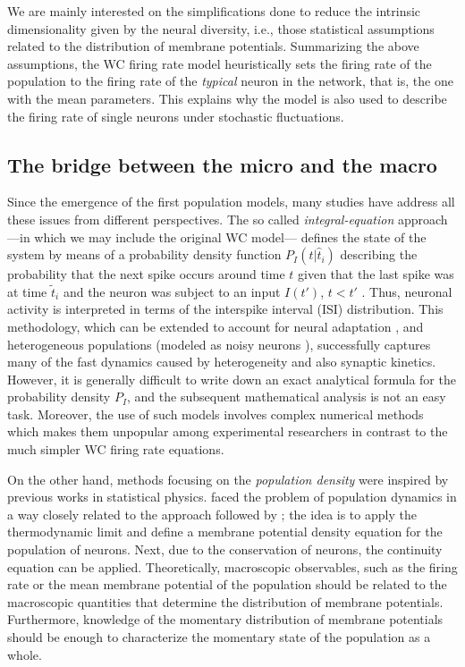 We are mainly interested on the simplifications done to reduce the
intrinsic dimensionality given by the neural diversity, i.e., those
statistical assumptions related to the distribution of membrane
potentials. Summarizing the above assumptions, the WC firing rate
model heuristically sets the firing rate of the population to the
firing rate of the \textit{typical} neuron in the network, that is,
the one with the mean parameters. This explains why the model is also
used to describe the firing rate of single neurons under stochastic
fluctuations.  

\subsection*{The bridge between the micro and the macro}

Since the emergence of the first population models,
many studies have address all these issues from different
perspectives. The so called \textit{integral-equation}
approach ---in which we may include the original WC \citeyear{Wilson1972}
model--- defines the state of the system by means of a probability
density function $P_I \left( t| \hat{t}_i\right)$ describing the
probability that the next spike occurs around time $t$ given that the
last spike was at time $\tilde{t}_i$ and the neuron was subject to an
input $I \left( t' \right)$, $t < t'$ \citep{Gerstner2014}. Thus,
neuronal activity is interpreted in terms of the interspike interval
(ISI) distribution. This methodology, which can be extended to account
for neural adaptation \citep{Naud2012}, and heterogeneous populations (modeled
as noisy neurons \citep{Ger00}), successfully captures many of the
fast dynamics caused by heterogeneity and also synaptic
kinetics. However, it is generally difficult to write down an exact
analytical formula for the probability density $P_I$, and the
subsequent mathematical analysis is not an easy task. Moreover, the
use of such models involves complex numerical 
methods which makes them unpopular among experimental researchers in
contrast to the much simpler WC firing rate equations.

On the other hand, methods focusing on the \textit{population density}
were inspired by previous works in statistical physics.
\citet{Amari1972} faced the problem of population
dynamics in a way closely related to the approach followed by
\citet{Kni72}; the idea is to apply the thermodynamic
limit and define a membrane potential density equation for the
population of neurons. Next, due to the conservation of neurons, the
continuity equation can be applied. Theoretically, macroscopic
observables, such as the firing rate or the mean membrane potential of
the population should be related to the macroscopic quantities that
determine the distribution of membrane potentials. Furthermore,
knowledge of the momentary distribution of membrane potentials should
be enough to characterize the momentary state of the population as a
whole.

